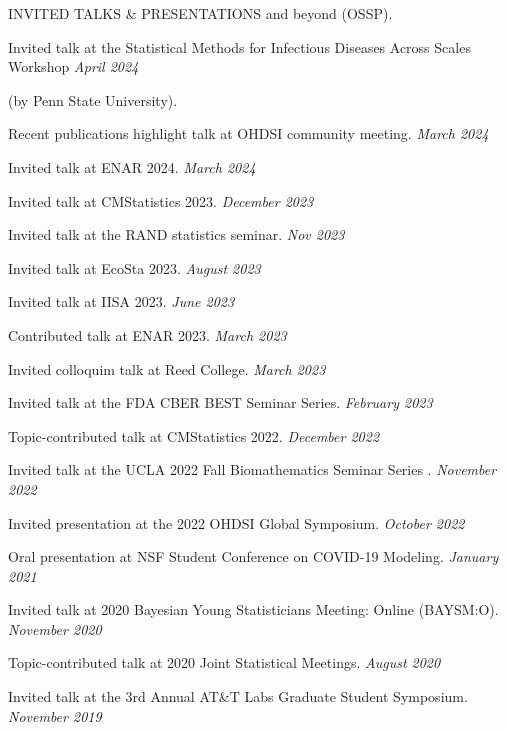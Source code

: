 \documentclass{resume} %
\begin{document}
\begin{rSection}{INVITED TALKS \& PRESENTATIONS}
	\vspace{-0.1in} 
	and beyond (OSSP).
	
	Invited talk at the Statistical Methods for Infectious Diseases Across Scales Workshop \hfill {\em April 2024}
	
	\vspace{-0.1in}
	(by Penn State University).
	
	Recent publications highlight talk at OHDSI community meeting. \hfill {\em March 2024}
	
	Invited talk at ENAR 2024.  \hfill {\em March 2024}
	
	Invited talk at CMStatistics 2023. \hfill {\em December 2023}
	
	Invited talk at the RAND statistics seminar. \hfill {\em Nov 2023}
	
	Invited talk at EcoSta 2023. \hfill {\em August 2023}
	
	Invited talk at IISA 2023.  \hfill {\em June 2023}
	
	
	Contributed talk at ENAR 2023. \hfill {\em March 2023}
	
	Invited colloquim talk at Reed College. \hfill {\em March 2023}
	
	Invited talk at the FDA CBER BEST Seminar Series. \hfill {\em February 2023}
	
	Topic-contributed talk at CMStatistics 2022. \hfill {\em December 2022}
	
	Invited talk at the UCLA 2022 Fall Biomathematics Seminar Series . \hfill {\em November 2022}
	
	Invited presentation at the 2022 OHDSI Global Symposium.  \hfill {\em October 2022}
	
	{Oral presentation at NSF Student Conference on COVID-19 Modeling.} \hfill {\em January 2021}
	
	{Invited talk at 2020 Bayesian Young Statisticians Meeting: Online (BAYSM:O).} \hfill {\em November 2020}
	
	{Topic-contributed talk at 2020 Joint Statistical Meetings. } \hfill {\em August 2020}
	
	{Invited talk at the 3rd Annual AT\&T Labs Graduate Student Symposium.} \hfill {\em November 2019}
	
	

\end{rSection}
\end{document}
